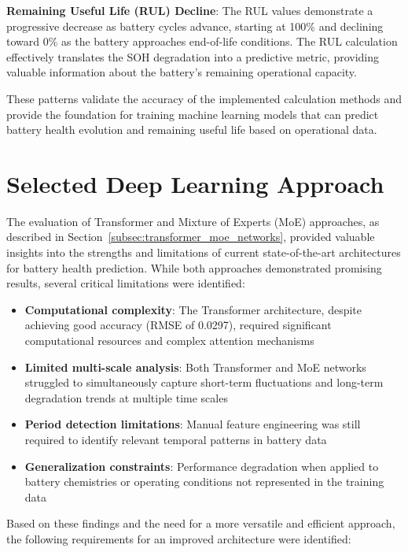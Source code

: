 \textbf{Remaining Useful Life (RUL) Decline}: The RUL values demonstrate a progressive decrease as battery cycles advance, starting at 100\% and declining toward 0\% as the battery approaches end-of-life conditions. The RUL calculation effectively translates the SOH degradation into a predictive metric, providing valuable information about the battery's remaining operational capacity.

These patterns validate the accuracy of the implemented calculation methods and provide the foundation for training machine learning models that can predict battery health evolution and remaining useful life based on operational data.

\section{Selected Deep Learning Approach}
\label{sec:timesnet_model}

The evaluation of Transformer and Mixture of Experts (MoE) approaches, as described in Section~\ref{subsec:transformer_moe_networks}, provided valuable insights into the strengths and limitations of current state-of-the-art architectures for battery health prediction. While both approaches demonstrated promising results, several critical limitations were identified:

\begin{itemize}
    \item \textbf{Computational complexity}: The Transformer architecture, despite achieving good accuracy (RMSE of 0.0297), required significant computational resources and complex attention mechanisms
    \item \textbf{Limited multi-scale analysis}: Both Transformer and MoE networks struggled to simultaneously capture short-term fluctuations and long-term degradation trends at multiple time scales
    \item \textbf{Period detection limitations}: Manual feature engineering was still required to identify relevant temporal patterns in battery data
    \item \textbf{Generalization constraints}: Performance degradation when applied to battery chemistries or operating conditions not represented in the training data
\end{itemize}

Based on these findings and the need for a more versatile and efficient approach, the following requirements for an improved architecture were identified:

